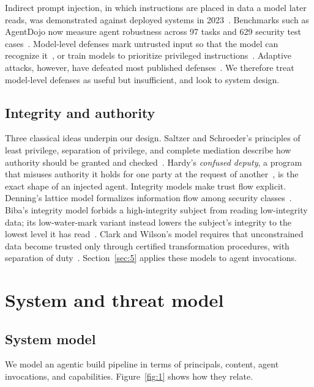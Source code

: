 \documentclass[acmsmall,screen,review]{acmart}
\begin{document}
Indirect prompt injection, in which instructions are placed in data a model later reads, was demonstrated against deployed systems in 2023~\cite{greshake2023not}. Benchmarks such as AgentDojo now measure agent robustness across 97 tasks and 629 security test cases~\cite{debenedetti2024agentdojo}. Model-level defenses mark untrusted input so that the model can recognize it~\cite{hines2024defending}, or train models to prioritize privileged instructions~\cite{wallace2024instruction}. Adaptive attacks, however, have defeated most published defenses~\cite{nasr2025attacker}. We therefore treat model-level defenses as useful but insufficient, and look to system design.


\subsection{Integrity and authority}\label{sec:2.4}

Three classical ideas underpin our design. Saltzer and Schroeder's principles of least privilege, separation of privilege, and complete mediation describe how authority should be granted and checked~\cite{saltzer1975protection}. Hardy's \emph{confused deputy}, a program that misuses authority it holds for one party at the request of another~\cite{hardy1988confused}, is the exact shape of an injected agent. Integrity models make trust flow explicit. Denning's lattice model formalizes information flow among security classes~\cite{denning1976lattice}. Biba's integrity model forbids a high-integrity subject from reading low-integrity data; its low-water-mark variant instead lowers the subject's integrity to the lowest level it has read~\cite{biba1977integrity}. Clark and Wilson's model requires that unconstrained data become trusted only through certified transformation procedures, with separation of duty~\cite{clark1987comparison}. Section~\ref{sec:5} applies these models to agent invocations.


\section{System and threat model}\label{sec:3}


\subsection{System model}\label{sec:3.1}

We model an agentic build pipeline in terms of principals, content, agent invocations, and capabilities. Figure~\ref{fig:1} shows how they relate.
\end{document}
